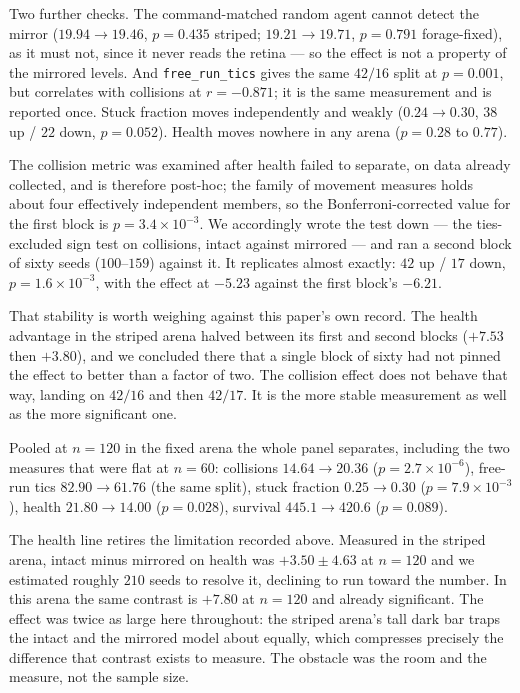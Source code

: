 \documentclass[10pt,twoside]{article}
\begin{document}
Two further checks. The command-matched random agent cannot detect the mirror
($19.94\to19.46$, $p=0.435$ striped; $19.21\to19.71$, $p=0.791$ forage-fixed),
as it must not, since it never reads the retina --- so the effect is not a
property of the mirrored levels. And \texttt{free\_run\_tics} gives the same
$42/16$ split at $p=0.001$, but correlates with collisions at $r=-0.871$; it is
the same measurement and is reported once. Stuck fraction moves independently
and weakly ($0.24\to0.30$, $38$ up / $22$ down, $p=0.052$). Health moves nowhere
in any arena ($p=0.28$ to $0.77$).

The collision metric was examined after health failed to separate, on data
already collected, and is therefore post-hoc; the family of movement measures
holds about four effectively independent members, so the Bonferroni-corrected
value for the first block is $p=3.4\times10^{-3}$. We accordingly wrote the test
down --- the ties-excluded sign test on collisions, intact against mirrored ---
and ran a second block of sixty seeds ($100$--$159$) against it. It replicates
almost exactly: $42$ up / $17$ down, $p=1.6\times10^{-3}$, with the effect at
$-5.23$ against the first block's $-6.21$.

That stability is worth weighing against this paper's own record. The health
advantage in the striped arena halved between its first and second blocks
($+7.53$ then $+3.80$), and we concluded there that a single block of sixty had
not pinned the effect to better than a factor of two. The collision effect does
not behave that way, landing on $42/16$ and then $42/17$. It is the more stable
measurement as well as the more significant one.

Pooled at $n=120$ in the fixed arena the whole panel separates, including the
two measures that were flat at $n=60$: collisions $14.64\to20.36$
($p=2.7\times10^{-6}$), free-run tics $82.90\to61.76$ (the same split), stuck
fraction $0.25\to0.30$ ($p=7.9\times10^{-3}$), health $21.80\to14.00$
($p=0.028$), survival $445.1\to420.6$ ($p=0.089$).

The health line retires the limitation recorded above. Measured in the striped
arena, intact minus mirrored on health was $+3.50\pm4.63$ at $n=120$ and we
estimated roughly $210$ seeds to resolve it, declining to run toward the number.
In this arena the same contrast is $+7.80$ at $n=120$ and already significant.
The effect was twice as large here throughout: the striped arena's tall dark bar
traps the intact and the mirrored model about equally, which compresses
precisely the difference that contrast exists to measure. The obstacle was the
room and the measure, not the sample size.
\end{document}
